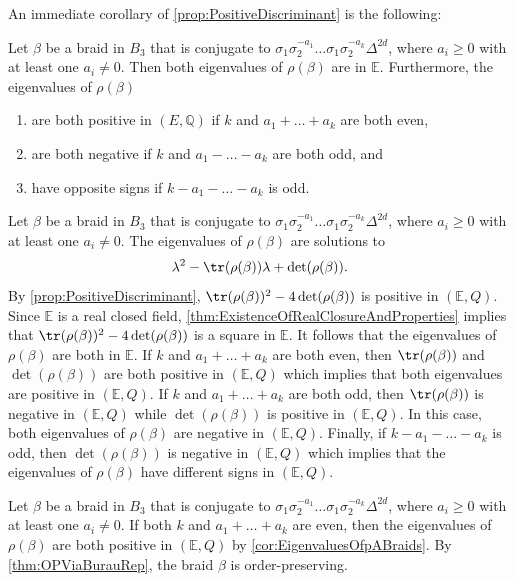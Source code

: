 \documentclass{amsart}
\makeatletter
\renewenvironment{proof}[1][\proofname]{%
   \par\pushQED{\qed}\normalfont%
   \topsep6\p@\@plus6\p@\relax
   \trivlist\item[\hskip\labelsep\bfseries#1\@addpunct{.}]%
   \ignorespaces
}{%
   \popQED\endtrivlist\@endpefalse
}
\makeatother
\begin{document}
An immediate corollary of \cref{prop:PositiveDiscriminant} is the following:

\begin{cor}
    \label{cor:EigenvaluesOfpABraids}
    Let $\beta$ be a braid in $B_3$ that is conjugate to $\sigma_1\sigma_2^{-a_1}\dots\sigma_1\sigma_2^{-a_k}\Delta^{2d}$, where $a_i \geq 0$ with at least one $a_i \neq 0$. Then both eigenvalues of $\rho(\beta)$ are in $\mathbb{E}$. Furthermore, the eigenvalues of $\rho(\beta)$
    \begin{enumerate}
        \item are both positive in $(E,\mathbb{Q})$ if $k$ and $a_1+\dots+a_k$ are both even,
        \item are both negative if $k$ and $a_1-\dots-a_k$ are both odd, and
        \item have opposite signs if $k -a_1-\dots-a_k$ is odd.
    \end{enumerate}
\end{cor}

\begin{proof}
    Let $\beta$ be a braid in $B_3$ that is conjugate to $\sigma_1\sigma_2^{-a_1}\dots\sigma_1\sigma_2^{-a_k}\Delta^{2d}$, where $a_i \geq 0$ with at least one $a_i \neq 0$. The eigenvalues of $\rho(\beta)$ are solutions to 
    \[
    \lambda^2 - \tr(\rho(\beta))\lambda + \det(\rho(\beta)).
    \]
    By \cref{prop:PositiveDiscriminant}, $\tr(\rho(\beta))^2 - 4\det(\rho(\beta))$ is positive in $(\mathbb{E},Q)$.  Since $\mathbb{E}$ is a real closed field,  \cref{thm:ExistenceOfRealClosureAndProperties} implies that $\tr(\rho(\beta))^2 - 4\det(\rho(\beta))$ is a square in $\mathbb{E}$. It follows that the eigenvalues of $\rho(\beta)$ are both in $\mathbb{E}$. If $k$ and $a_1+\dots+a_k$ are both even, then $\tr(\rho(\beta))$ and $\det(\rho(\beta))$ are both positive in $(\mathbb{E},Q)$ which implies that both eigenvalues are positive in $(\mathbb{E},Q)$. If $k$ and $a_1+\dots+a_k$ are both odd, then $\tr(\rho(\beta))$ is negative in $(\mathbb{E},Q)$ while $\det(\rho(\beta))$ is positive in $(\mathbb{E},Q)$. In this case, both eigenvalues of $\rho(\beta)$ are negative in $(\mathbb{E},Q)$. Finally, if $k-a_1-\dots-a_k$ is odd, then $\det(\rho(\beta))$ is negative in $(\mathbb{E},Q)$ which implies that the eigenvalues of $\rho(\beta)$ have different signs in $(\mathbb{E},Q).$
\end{proof}

\begin{proof}[Proof of \cref{thm:EvenEvenBraidsAreOP}]
    Let $\beta$ be a braid in $B_3$ that is conjugate to $\sigma_1\sigma_2^{-a_1}\dots\sigma_1\sigma_2^{-a_k}\Delta^{2d}$, where $a_i \geq 0$ with at least one $a_i \neq 0$. If both $k$ and $a_1+\dots+a_k$ are even, then the eigenvalues of $\rho(\beta)$ are both positive in $(\mathbb{E},Q)$ by \cref{cor:EigenvaluesOfpABraids}. By \cref{thm:OPViaBurauRep}, the braid $\beta$ is order-preserving.
\end{proof}
\end{document}
